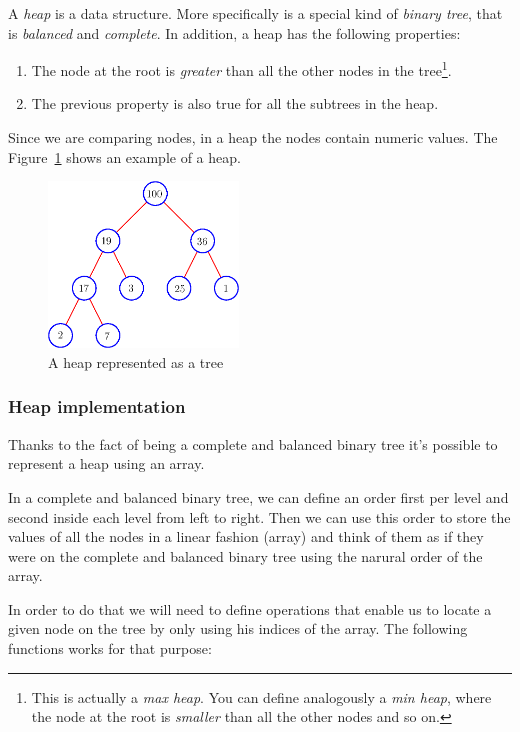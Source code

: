 A \emph{heap} is a data structure.
More specifically is a special kind of \emph{binary tree}, that is \emph{balanced} and \emph{complete}.
In addition, a heap has the following properties:
\begin{enumerate}
 \item The node at the root is \emph{greater} than all the other nodes in the tree\footnote{This is actually a \emph{max heap}. You can define analogously a \emph{min heap}, where the node at the root is \emph{smaller} than all the other nodes and so on.}.
 \item The previous property is also true for all the subtrees in the heap.
\end{enumerate}

Since we are comparing nodes, in a heap the nodes contain numeric values. The Figure~\ref{fig:heap} shows an example of a heap.

\begin{figure}[htb]
  \centering
  \includegraphics[width=0.45\textwidth]{img/heapTree}
  \caption{A heap represented as a tree}
  \label{fig:heap}
\end{figure}

\subsubsection{Heap implementation}

Thanks to the fact of being a complete and balanced binary tree it's possible to represent a heap using an array.

In a complete and balanced binary tree, we can define an order first per level and second inside each level from left to right.
Then we can use this order to store the values of all the nodes in a linear fashion (array) and think of them as if they were on the complete and balanced binary tree using the narural order of the array.

In order to do that we will need to define operations that enable us to locate a given node on the tree by only using his indices of the array.
The following functions works for that purpose:


